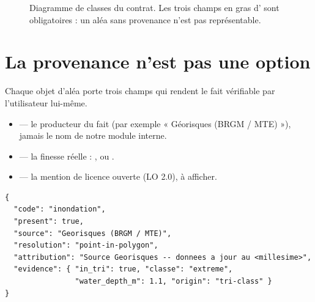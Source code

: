 \begin{figure}[h]
{
}
\caption{Diagramme de classes du contrat. Les trois champs en gras d'
sont obligatoires : un aléa sans provenance n'est pas représentable.}
\label{fig:classes}
\end{figure}

\section{La provenance n'est pas une option}

Chaque objet d'aléa porte trois champs qui rendent le fait vérifiable par
l'utilisateur lui-même.

\begin{itemize}
  \item {} — le producteur du fait (par exemple « Géorisques (BRGM /
    MTE) »), jamais le nom de notre module interne.
  \item {} — la finesse réelle : ,
     ou .
  \item {} — la mention de licence ouverte (LO 2.0), à afficher.
\end{itemize}

\begin{lstlisting}[caption={Un objet d'aléa tel qu'il sort du pipeline (extrait, valeurs réelles).}]
{
  "code": "inondation",
  "present": true,
  "source": "Georisques (BRGM / MTE)",
  "resolution": "point-in-polygon",
  "attribution": "Source Georisques -- donnees a jour au <millesime>",
  "evidence": { "in_tri": true, "classe": "extreme",
                "water_depth_m": 1.1, "origin": "tri-class" }
}
\end{lstlisting}

